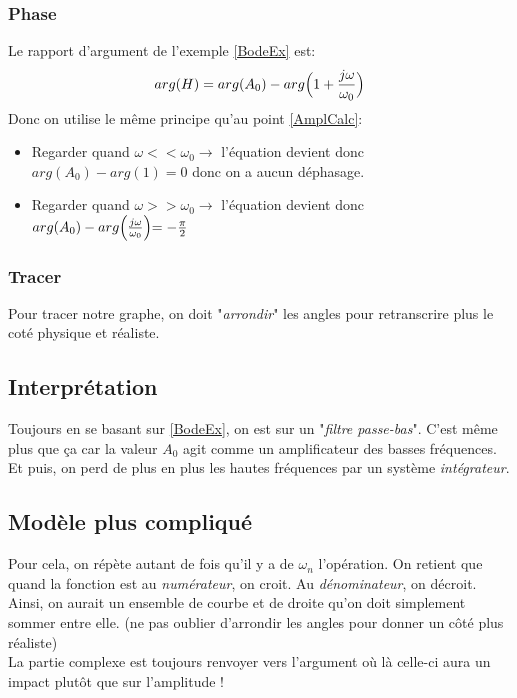 \documentclass{report}
\begin{document}
\subsubsection{Phase}
Le rapport d'argument de l'exemple \ref{BodeEx} est:
\begin{equation}
arg(H) =  arg(A_0) - arg\Bigl(1 + \frac{j\omega}{\omega_0}\Bigl)
\end{equation}
Donc on utilise le même principe qu'au point \ref{AmplCalc}:
\begin{itemize}
\item Regarder quand $\omega < < \omega_0 \rightarrow$ l'équation devient donc $arg(A_0)-arg(1) = 0$ donc on a aucun déphasage.
\item Regarder quand $\omega > > \omega_0 \rightarrow$ l'équation devient donc $arg(A_0) -arg\Bigl(\frac{j\omega}{\omega_0}\Bigl) = -\frac{\pi}{2}$
\end{itemize}

\subsubsection{Tracer}
Pour tracer notre graphe, on doit "\textit{arrondir}" les angles pour retranscrire plus le coté physique et réaliste.

\subsection{Interprétation}
Toujours en se basant sur \ref{BodeEx}, on est sur un "\textit{filtre passe-bas}". C'est même plus que ça car la valeur $A_0$ agit comme un amplificateur des basses fréquences. Et puis, on perd de plus en plus les hautes fréquences par un système \textit{intégrateur}.

\subsection{Modèle plus compliqué}
Pour cela, on répète autant de fois qu'il y a de $\omega_n$ l'opération. On retient que quand la fonction est au \textit{numérateur}, on croit. Au \textit{dénominateur}, on décroit.\\
Ainsi, on aurait un ensemble de courbe et de droite qu'on doit simplement sommer entre elle. (ne pas oublier d'arrondir les angles pour donner un côté plus réaliste)\\
La partie complexe est toujours renvoyer vers l'argument où là celle-ci aura un impact plutôt que sur l'amplitude !
\end{document}
